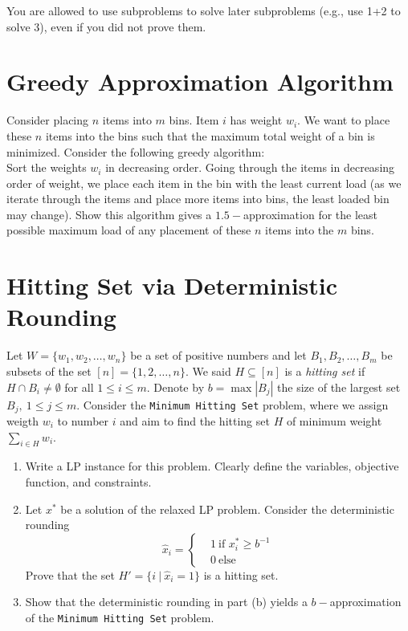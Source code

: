 \documentclass[10pt,letterpaper]{article}
\begin{document}
You are allowed to use subproblems to solve later subproblems (e.g., use 1+2 to solve 3), even if you did not prove them. 

\section{Greedy Approximation Algorithm}

Consider placing $n$ items into $m$ bins. Item $i$ has weight $w_i$. We want to place these $n$ items into the bins such that the maximum total weight of a bin is minimized. Consider the following greedy
algorithm:\\

Sort the weights $w_i$ in decreasing order. Going through the items in decreasing order of weight, we place each item in the bin with the least current load (as we iterate through the items and place
more items into bins, the least loaded bin may change).
Show this algorithm gives a $1.5-$approximation for the least possible maximum load of any placement of these $n$ items into the $m$ bins.

\section{Hitting Set via Deterministic Rounding}

Let $W=\{w_1, w_2, \ldots, w_n\}$ be a set of positive numbers and let $B_1, B_2, \ldots, B_m$ be subsets of the set $[n]=\{1,2,\ldots, n\}$. We said $H\subseteq [n]$ is a {\it hitting set} if $H\cap B_i\neq \emptyset$ for all $1\leq i\leq m$. Denote by $b=\max |B_j|$ the size of the largest set $B_j,~1\leq j\leq m$. Consider the {\tt Minimum Hitting Set} problem, where we assign weigth $w_i$ to number $i$ and aim to find the hitting set $H$ of minimum weight $\sum_{i\in H} w_i$.\\ 


\begin{enumerate}
    \item Write a LP instance for this problem. Clearly define the variables, objective function, and constraints.
    
    \item Let $x^*$ be a solution of the relaxed LP problem. Consider the deterministic rounding 
    \[
      \hat{x}_i=\begin{cases}
      & 1~\text{if $x^*_i\geq b^{-1}$}\\
      & 0~\text{else}
    \end{cases}
    \]
    Prove that the set $H'=\{i~|~\hat{x}_i=1\}$ is a hitting set.
    \item Show that the deterministic rounding in part (b) yields a $b-$approximation of the {\tt Minimum Hitting Set} problem.
\end{enumerate}
\end{document}
